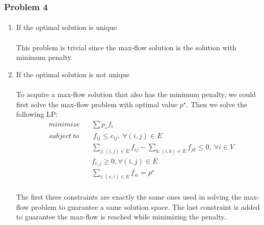 \subsubsection*{Problem 4}
\paragraph{}
\vspace{-18pt}
\begin{enumerate}
	\item If the optimal solution is unique
	\vspace{-18pt}
	\paragraph{}
	This problem is trivial since the max-flow solution is the solution with minimum penalty.
	\item If the optimal solution is not unique
	\vspace{-18pt}
	\paragraph{}
	To acquire a max-flow solution that also has the minimum penalty, we could first solve the max-flow problem with optimal value $p^{\star}$. Then we solve the following LP:
	\begin{align*}
	& minimize \quad \ \ \  \sum p_ef_e\\
	& subject \ to \qquad f_{ij} \leq c_{ij}, \ \forall (i,j) \in E\\
	&\qquad \qquad \qquad  \sum_{j:(i, j)\in E} f_{ij} - \sum_{k:(i, k)\in E} f_{jk} \leq 0, \ \forall i \in V \\
	&\qquad \qquad \qquad  f_{i, j} \geq 0, \forall (i, j) \in E\\
	&\qquad \qquad \qquad  \sum_{i:(s, i)\in E} f_{si} = p^{\star}
	\end{align*}
	\vspace{-30pt}
	\paragraph{}
	The first three constraints are exactly the same ones used in solving the max-flow problem to guarantee a same solution space. The last constraint is added to guarantee the max-flow is reached while minimizing the penalty.
\end{enumerate}
